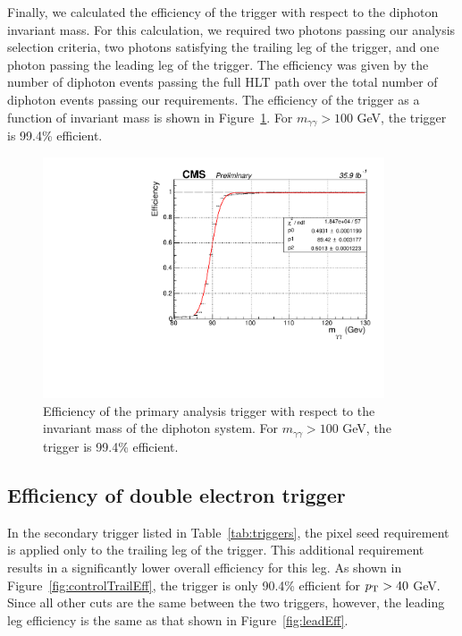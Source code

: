 Finally, we calculated the efficiency of the trigger with respect to the diphoton invariant mass. For this calculation, we required two photons passing our analysis selection criteria, two photons satisfying the trailing leg of the trigger, and one photon passing the leading leg of the trigger. The efficiency was given by the number of diphoton events passing the full HLT path over the total number of diphoton events passing our requirements. The efficiency of the trigger as a function of invariant mass is shown in Figure~\ref{fig:InvMassEff}. For $m_{\gamma\gamma} > 100$ GeV, the trigger is 99.4\% efficient.

\begin{figure}[h]
\begin{center}
\includegraphics[width=0.9\textwidth]{Figures/Trigger/InvMassEff.pdf}
\end{center}
\caption{Efficiency of the primary analysis trigger with respect to the invariant mass of the diphoton system. 
For $m_{\gamma\gamma} > 100$ GeV, the trigger is 99.4\% efficient.}
\label{fig:InvMassEff}
\end{figure}

\subsection{Efficiency of double electron trigger}
\label{sec:eeEff}
In the secondary trigger listed in Table~\ref{tab:triggers}, the pixel seed requirement is applied only to the trailing
leg of the trigger. This additional requirement results in a significantly lower overall efficiency for this leg. As shown in Figure~\ref{fig:controlTrailEff},
the trigger is only 90.4\% efficient for $p_{\mathrm{T}} > 40$ GeV.
Since all other cuts are the same between the two triggers, however, the leading leg efficiency is the same as that shown in Figure~\ref{fig:leadEff}.

